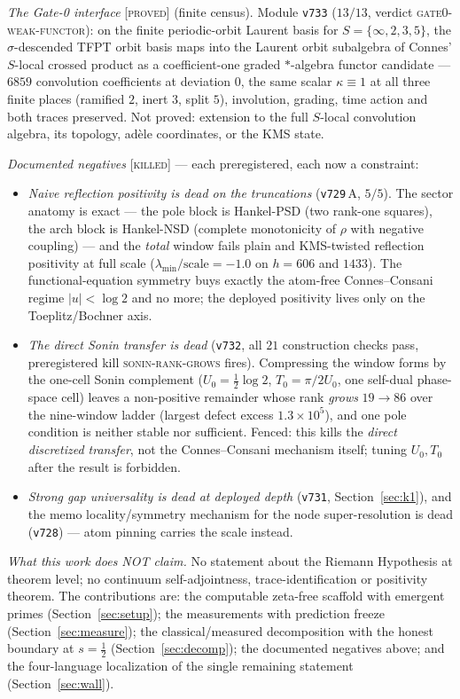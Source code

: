 \documentclass[11pt,a4paper]{article}
\theoremstyle{remark}
\newcommand{\PROVED}{\textnormal{[\textsc{proved}]}}
\newcommand{\KILLED}{\textnormal{[\textsc{killed}]}}
\begin{document}
\emph{The Gate-0 interface} \PROVED{} (finite census).  Module
\texttt{v733} ($13/13$, verdict \textsc{gate0-weak-functor}): on the
finite periodic-orbit Laurent basis for $S=\{\infty,2,3,5\}$, the
$\sigma$-descended TFPT orbit basis maps into the Laurent orbit
subalgebra of Connes' $S$-local crossed product as a coefficient-one
graded $*$-algebra functor candidate --- $6859$ convolution
coefficients at deviation $0$, the same scalar $\kappa\equiv1$ at
all three finite places (ramified $2$, inert $3$, split $5$),
involution, grading, time action and both traces preserved.  Not
proved: extension to the full $S$-local convolution algebra, its
topology, ad\`ele coordinates, or the KMS state.

\emph{Documented negatives} \KILLED{} --- each preregistered, each
now a constraint:
\begin{itemize}
\item \emph{Naive reflection positivity is dead on the truncations}
(\texttt{v729}\,A, $5/5$).  The sector anatomy is exact --- the pole
block is Hankel-PSD (two rank-one squares), the arch block is
Hankel-NSD (complete monotonicity of $\rho$ with negative coupling)
--- and the \emph{total} window fails plain and KMS-twisted
reflection positivity at full scale
($\lambda_{\min}/\text{scale}=-1.0$ on $h=606$ and $1433$).  The
functional-equation symmetry buys exactly the atom-free
Connes--Consani regime $|u|<\log2$ and no more; the deployed
positivity lives only on the Toeplitz/Bochner axis.
\item \emph{The direct Sonin transfer is dead}
(\texttt{v732}, all $21$ construction checks pass, preregistered
kill \textsc{sonin-rank-grows} fires).  Compressing the window forms
by the one-cell Sonin complement ($U_0=\tfrac12\log2$,
$T_0=\pi/2U_0$, one self-dual phase-space cell) leaves a
non-positive remainder whose rank \emph{grows} $19\to86$ over the
nine-window ladder (largest defect excess $1.3\times10^5$), and one
pole condition is neither stable nor sufficient.  Fenced: this kills
the \emph{direct discretized transfer}, not the Connes--Consani
mechanism itself; tuning $U_0,T_0$ after the result is forbidden.
\item \emph{Strong gap universality is dead at deployed depth}
(\texttt{v731}, Section~\ref{sec:k1}), and the memo
locality/symmetry mechanism for the node super-resolution is dead
(\texttt{v728}) --- atom pinning carries the scale instead.
\end{itemize}

\emph{What this work does NOT claim.}  No statement about the
Riemann Hypothesis at theorem level; no continuum self-adjointness,
trace-identification or positivity theorem.  The contributions are:
the computable zeta-free scaffold with emergent primes
(Section~\ref{sec:setup}); the measurements with prediction freeze
(Section~\ref{sec:measure}); the classical/measured decomposition
with the honest boundary at $s=\tfrac12$ (Section~\ref{sec:decomp});
the documented negatives above; and the four-language localization
of the single remaining statement (Section~\ref{sec:wall}).
\end{document}
